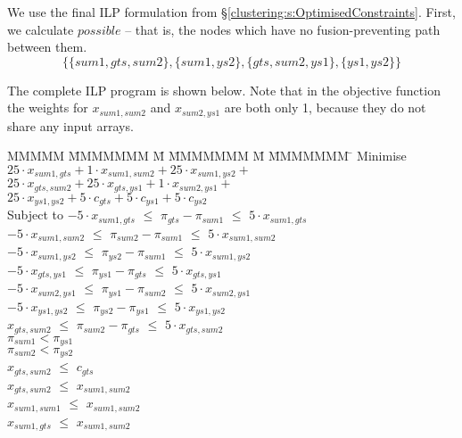 We use the final ILP formulation from \S\ref{clustering:s:OptimisedConstraints}. First, we calculate $possible$ -- that is, the nodes which have no fusion-preventing path between them.
\[ \{ \{sum1, gts, sum2\}
 , \{sum1, ys2\}
 , \{gts, sum2, ys1\}
 , \{ys1, ys2\} \} \]

The complete ILP program is shown below. Note that in the objective function the weights for $x_{sum1, sum2}$ and $x_{sum2, ys1}$ are both only 1, because they do not share any input arrays.

\begin{tabbing}
MMMMM   \= MMMMMMM \= M \= MMMMMMM \= M \= MMMMMMM \= \kill
Minimise   \> $25 \cdot x_{sum1, gts} + 1  \cdot x_{sum1,sum2} + 25 \cdot x_{sum1, ys2} +$ \\
           \> $25 \cdot x_{gts, sum2} + 25 \cdot x_{gts, ys1} + 1 \cdot x_{sum2, ys1} +$ \\
           \> $25 \cdot x_{ys1, ys2}  + 5  \cdot c_{gts} + 5 \cdot c_{ys1} + 5 \cdot c_{ys2} $
\\[0.5ex]
Subject to 
    \> $-5 \cdot x_{sum1, gts}$  \> $\le$ \> $\pi_{gts} - \pi_{sum1}$  \> $\le$ \> $5 \cdot x_{sum1, gts}$  \\
    \> $-5 \cdot x_{sum1, sum2}$ \> $\le$ \> $\pi_{sum2} - \pi_{sum1}$ \> $\le$ \> $5 \cdot x_{sum1, sum2}$ \\
    \> $-5 \cdot x_{sum1, ys2 }$ \> $\le$ \> $\pi_{ys2 } - \pi_{sum1}$ \> $\le$ \> $5 \cdot x_{sum1, ys2 }$ \\
    \> $-5 \cdot x_{gts,  ys1 }$ \> $\le$ \> $\pi_{ys1 } - \pi_{gts }$ \> $\le$ \> $5 \cdot x_{gts, ys1  }$ \\
    \> $-5 \cdot x_{sum2, ys1 }$ \> $\le$ \> $\pi_{ys1 } - \pi_{sum2}$ \> $\le$ \> $5 \cdot x_{sum2, ys1 }$ \\
    \> $-5 \cdot x_{ys1, ys2  }$ \> $\le$ \> $\pi_{ys2 } - \pi_{ys1 }$ \> $\le$ \> $5 \cdot x_{ys1, ys2  }$ 
\\[0.5ex]
    \> $   x_{gts, sum2 }$ \> $\le$ \> $\pi_{sum2} - \pi_{gts }$ \> $\le$ \> $5 \cdot x_{gts, sum2 }$ 
\\[0.5ex]
    \>                     \>       \> $\pi_{sum1} < \pi_{ys1}$ \\
    \>                     \>       \> $\pi_{sum2} < \pi_{ys2}$
\\[0.5ex]
    \> $ x_{gts,sum2} $    \> $\le$ \> $c_{gts}$
\\[0.5ex]
    \> $x_{gts, sum2}$     \> $\le$ \> $x_{sum1, sum2}$ \\
    \> $x_{sum1,sum1}$     \> $\le$ \> $x_{sum1, sum2}$ \\
    \> $x_{sum1, gts}$     \> $\le$ \> $x_{sum1, sum2}$
\end{tabbing}
\noindent


